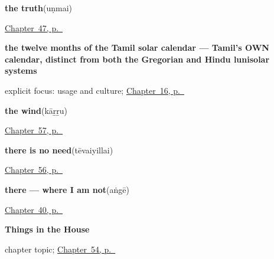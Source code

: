 \noindent\begin{minipage}[t]{\linewidth}
\raggedright
\textbf{the truth}\enspace\emph{}\enspace(uṇmai)\par
\footnotesize \hyperref[ch:ta-replies]{Chapter~47, p.~\pageref*{ch:ta-replies}}
\end{minipage}\par\smallskip

\noindent\begin{minipage}[t]{\linewidth}
\raggedright
\textbf{the twelve months of the Tamil solar calendar — Tamil's OWN calendar, distinct from both the Gregorian and Hindu lunisolar systems}\enspace\emph{           }\par
\footnotesize explicit focus: usage and culture; \hyperref[ch:ta-tamil-months]{Chapter~16, p.~\pageref*{ch:ta-tamil-months}}
\end{minipage}\par\smallskip

\noindent\begin{minipage}[t]{\linewidth}
\raggedright
\textbf{the wind}\enspace\emph{}\enspace(kāṟṟu)\par
\footnotesize \hyperref[ch:ta-wind-and-fire]{Chapter~57, p.~\pageref*{ch:ta-wind-and-fire}}
\end{minipage}\par\smallskip

\noindent\begin{minipage}[t]{\linewidth}
\raggedright
\textbf{there is no need}\enspace\emph{}\enspace(tēvaiyillai)\par
\footnotesize \hyperref[ch:ta-how-much]{Chapter~56, p.~\pageref*{ch:ta-how-much}}
\end{minipage}\par\smallskip

\noindent\begin{minipage}[t]{\linewidth}
\raggedright
\textbf{there — where I am not}\enspace\emph{}\enspace(aṅgē)\par
\footnotesize \hyperref[ch:ta-pointing-and-asking]{Chapter~40, p.~\pageref*{ch:ta-pointing-and-asking}}
\end{minipage}\par\smallskip

\noindent\begin{minipage}[t]{\linewidth}
\raggedright
\textbf{Things in the House}\par
\footnotesize chapter topic; \hyperref[ch:ta-things-in-the-house]{Chapter~54, p.~\pageref*{ch:ta-things-in-the-house}}
\end{minipage}\par\smallskip


